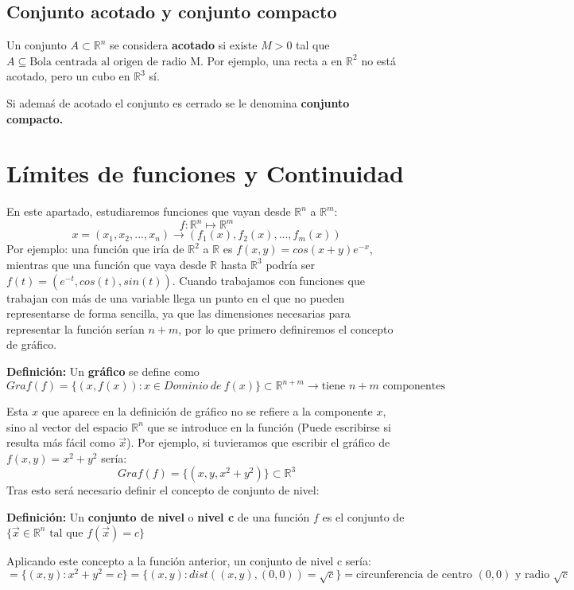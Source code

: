 \documentclass[11pt]{article}
\newcommand{\R}{\mathbb{R}}
\theoremstyle{plain}
\begin{document}
        \subsection{Conjunto acotado y conjunto compacto} %
        \label{sub:conjunto_acotado_y_conjunto_compacto}
            Un conjunto $A \subset \R^n$ se considera \textbf{acotado} si existe $M>0$ tal que $A\subseteq \text{Bola centrada al origen de radio M}$. Por ejemplo, una recta a en $\R^2$ no está acotado, pero un cubo en $\R^3$ sí.

            Si ademaś de acotado el conjunto es cerrado se le denomina \textbf{conjunto  compacto.}
    \section{Límites de funciones y Continuidad} %
    \label{sec:límites_de_funciones_y_continuidad}
        En este apartado, estudiaremos funciones que vayan desde $\R^n$ a $\R^m$:
        \[f: \R^n \longmapsto \R^m \]
        \[x=(x_1,x_2,...,x_n) \rightarrow (f_1(x),f_2(x),...,f_m(x))\]
        Por ejemplo: una función que iría de $\R^2$ a $\R$ es $f(x,y) = cos(x+y)e^{-x}$, mientras que una función que vaya desde $\R$ hasta $\R^3$ podría ser $f(t) = (e^{-t}, cos(t), sin(t))$. Cuando trabajamos con funciones que trabajan con más de una variable llega un punto en el que no pueden representarse de forma sencilla, ya que las dimensiones necesarias para representar la función serían $n+m$, por lo que primero definiremos el concepto de gráfico.
        \begin{center}
            \textbf{Definición:} Un \textbf{gráfico} se define como \[Graf(f) = \{(x,f(x)): x \in Dominio \ de \ f(x) \} \subset \R^{n+m} \rightarrow \text{tiene $n+m$ componentes}\]
        \end{center}
        Esta $x$ que aparece en la definición de gráfico no se refiere a la componente $x$, sino al vector del espacio $\R^n$ que se introduce en la función (Puede escribirse si resulta más fácil como $\vec{x}$). Por ejemplo, si tuvieramos que escribir el gráfico de $f(x,y) = x^2 + y ^2$ sería:
        \[Graf(f) = \{(x,y,x^2 + y^2)\} \subset \R^3\]
        Tras esto será necesario definir el concepto de conjunto de nivel:
        \begin{center}
            \textbf{Definición:} Un \textbf{conjunto de nivel} o \textbf{nivel c} de una función $f$ es el conjunto de $\{\vec{x} \in \R^n \text{ tal que } f(\vec{x}) = c \}$
        \end{center}
        Aplicando este concepto a la función anterior, un conjunto de nivel c sería: \[= \{(x,y) : x^2+y^2 = c\} = \{(x,y): dist((x,y),(0,0)) = \sqrt{c}\} = \text{circunferencia de centro $(0,0)$ y radio $\sqrt{c}$}\]
\end{document}
